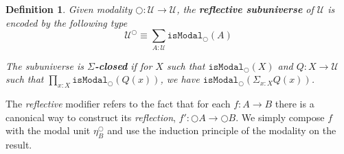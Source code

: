 \documentclass[12pt]{report}
\newtheorem{defn}[thm]{Definition}
\begin{document}
\begin{defn}
Given modality $\bigcirc : \mathcal{U} \rightarrow \mathcal{U}$, the \textbf{reflective subuniverse} of $\mathcal{U}$ is encoded by the following type
$$\mathcal{U}^\bigcirc \equiv \sum_{A : \mathcal{U}}\mathtt{isModal}_\bigcirc (A)$$

The subuniverse is $\Sigma$\textbf{-closed} if for $X$ such that $\mathtt{isModal}_{\bigcirc}(X)$ and $Q : X \rightarrow \mathcal{U}$ such that $\prod_{x : X} \mathtt{isModal}_{\bigcirc}(Q(x))$, we have $\mathtt{isModal}_{\bigcirc}(\Sigma_{x : X} Q(x))$.
\end{defn}
The \textit{reflective} modifier refers to the fact that for each $f : A \rightarrow B$ there is a canonical way to construct its \textit{reflection}, $f' : \bigcirc A \rightarrow \bigcirc B$. 
We simply compose $f$ with the modal unit $\eta_B^\bigcirc$ and use the induction principle of the modality on the result. 
\end{document}
